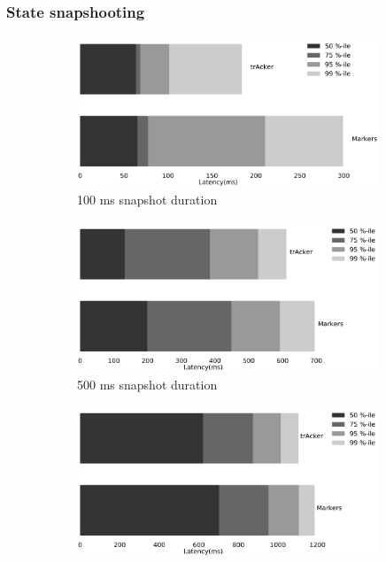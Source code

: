 \subsubsection{State snapshooting}
\begin{figure}[t!]
    \begin{subfigure}[b]{0.32\textwidth}
            \includegraphics[width=0.99\textwidth]{pics/buffering_latencies_barh_100.pdf}
            \caption{100 ms snapshot duration}
            \label{100ms_snapshot}
    \end{subfigure}
    \hspace{5mm}
    \begin{subfigure}[b]{0.32\textwidth}
            \includegraphics[width=0.99\textwidth]{pics/buffering_latencies_barh_500.pdf}
            \caption{500 ms snapshot duration}
            \label{500ms_snapshot}
    \end{subfigure}
    \hspace{5mm}
    \begin{subfigure}[b]{0.32\textwidth}
            \includegraphics[width=0.99\textwidth]{pics/buffering_latencies_barh_1000.pdf}

\end{subfigure}
\end{figure}

